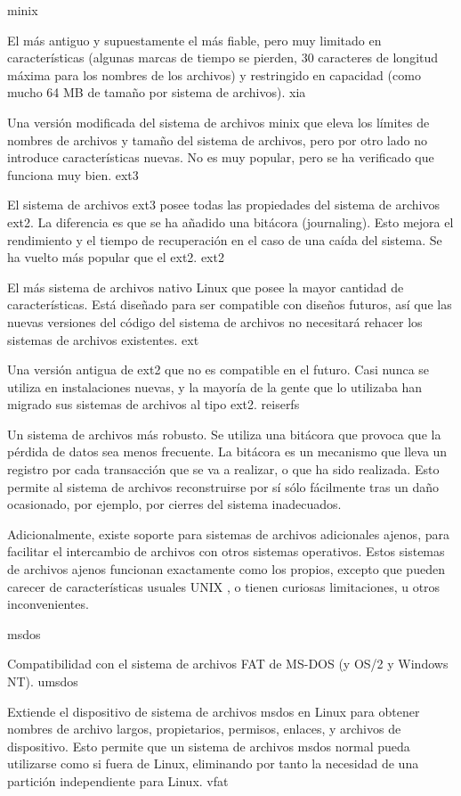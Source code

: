 \documentclass[12pt]{article}
\begin{document}
minix

    El más antiguo y supuestamente el más fiable, pero muy limitado en características (algunas marcas de tiempo se pierden, 30 caracteres de longitud máxima para los nombres de los archivos) y restringido en capacidad (como mucho 64 MB de tamaño por sistema de archivos).
xia

    Una versión modificada del sistema de archivos minix que eleva los límites de nombres de archivos y tamaño del sistema de archivos, pero por otro lado no introduce características nuevas. No es muy popular, pero se ha verificado que funciona muy bien.
ext3

    El sistema de archivos ext3 posee todas las propiedades del sistema de archivos ext2. La diferencia es que se ha añadido una bitácora (journaling). Esto mejora el rendimiento y el tiempo de recuperación en el caso de una caída del sistema. Se ha vuelto más popular que el ext2.
ext2

    El más sistema de archivos nativo Linux que posee la mayor cantidad de características. Está diseñado para ser compatible con diseños futuros, así que las nuevas versiones del código del sistema de archivos no necesitará rehacer los sistemas de archivos existentes.
ext

    Una versión antigua de ext2 que no es compatible en el futuro. Casi nunca se utiliza en instalaciones nuevas, y la mayoría de la gente que lo utilizaba han migrado sus sistemas de archivos al tipo ext2.
reiserfs

    Un sistema de archivos más robusto. Se utiliza una bitácora que provoca que la pérdida de datos sea menos frecuente. La bitácora es un mecanismo que lleva un registro por cada transacción que se va a realizar, o que ha sido realizada. Esto permite al sistema de archivos reconstruirse por sí sólo fácilmente tras un daño ocasionado, por ejemplo, por cierres del sistema inadecuados.

Adicionalmente, existe soporte para sistemas de archivos adicionales ajenos, para facilitar el intercambio de archivos con otros sistemas operativos. Estos sistemas de archivos ajenos funcionan exactamente como los propios, excepto que pueden carecer de características usuales UNIX , o tienen curiosas limitaciones, u otros inconvenientes.

msdos

    Compatibilidad con el sistema de archivos FAT de MS-DOS (y OS/2 y Windows NT).
umsdos

    Extiende el dispositivo de sistema de archivos msdos en Linux para obtener nombres de archivo largos, propietarios, permisos, enlaces, y archivos de dispositivo. Esto permite que un sistema de archivos msdos normal pueda utilizarse como si fuera de Linux, eliminando por tanto la necesidad de una partición independiente para Linux.
vfat
\end{document}
